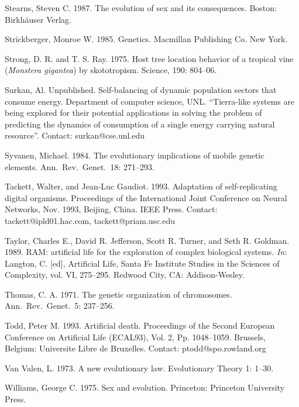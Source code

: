 \begin{thebibliography}{99}
Stearns, Steven C.  1987.  The evolution of sex and its consequences.
Boston: Birkh\"{a}user Verlag.

Strickberger, Monroe W.  1985.  Genetics.  Macmillan Publishing Co.  New
York.

Strong, D. R. and T. S. Ray.  1975.  Host tree location behavior of a tropical
vine ({\it Monstera gigantea}) by skototropism.  Science, 190: 804--06.

Surkan, Al.  Unpublished.  Self-balancing of dynamic population sectors
that consume energy.  Department of computer science, UNL.  ``Tierra-like
systems are being explored for their potential applications in solving
the problem of predicting the dynamics of consumption of a single energy
carrying natural resource''.  Contact: surkan@cse.unl.edu

Syvanen, Michael.  1984.  The evolutionary implications of mobile
genetic elements.  Ann.\ Rev.\ Genet.\ 18: 271--293.

Tackett, Walter, and Jean-Luc Gaudiot.  1993.  Adaptation of self-replicating
digital organisms.  Proceedings of the International Joint Conference on
Neural Networks, Nov. 1993, Beijing, China.  IEEE Press.
Contact: tackett@ipld01.hac.com, tackett@priam.usc.edu

Taylor, Charles E., David R. Jefferson, Scott R. Turner, and
Seth R. Goldman.  1989.  RAM: artificial life for the exploration
of complex biological systems.
{\em In\/}: Langton, C. [ed], Artificial Life, Santa Fe Institute
Studies in the Sciences of Complexity, vol. VI, 275--295.
Redwood City, CA: Addison-Wesley.

Thomas, C. A.  1971.  The genetic organization of chromosomes.
Ann.\ Rev.\ Genet.\ 5: 237--256.

Todd, Peter M.  1993.  Artificial death.  Proceedings of the Second European
Conference on Artificial Life (ECAL93), Vol. 2, Pp. 1048--1059.
Brussels, Belgium: Universite Libre de Bruxelles.
Contact: ptodd@spo.rowland.org

Van Valen, L.  1973.  A new evolutionary law.  Evolutionary Theory 1: 1--30.

Williams, George C.  1975.  Sex and evolution.  Princeton: Princeton
University Press.

\end{thebibliography}



